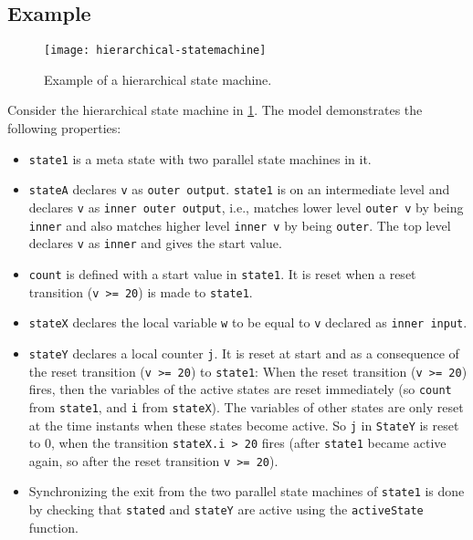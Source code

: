 \subsection{Example}\label{example}

\begin{figure}[H]
  \begin{center}
    \texttt{[image: hierarchical-statemachine]}
  \end{center}
  \caption{
    Example of a hierarchical state machine.
  }
  \label{fig:hierarchical-statemachine}
\end{figure}

\begin{example}
Consider the hierarchical state machine in \cref{fig:hierarchical-statemachine}.
The model demonstrates the following properties:
\begin{itemize}
\item
  \lstinline!state1! is a meta state with two parallel state machines in it.
\item
  \lstinline!stateA! declares \lstinline!v! as \lstinline!outer output!.
  \lstinline!state1! is on an intermediate level and declares \lstinline!v! as \lstinline!inner outer output!, i.e., matches lower level \lstinline!outer v! by being \lstinline!inner! and also matches higher level \lstinline!inner v! by being \lstinline!outer!.
  The top level declares \lstinline!v! as \lstinline!inner! and gives the start value.
\item
  \lstinline!count! is defined with a start value in \lstinline!state1!.
  It is reset when a reset transition (\lstinline!v >= 20!) is made to \lstinline!state1!.
\item
  \lstinline!stateX! declares the local variable \lstinline!w! to be equal to \lstinline!v! declared as \lstinline!inner input!.
\item
  \lstinline!stateY! declares a local counter \lstinline!j!.
  It is reset at start and as a consequence of the reset transition (\lstinline!v >= 20!) to \lstinline!state1!: When the reset transition (\lstinline!v >= 20!) fires, then the variables of the active states are reset immediately (so \lstinline!count! from \lstinline!state1!, and \lstinline!i! from \lstinline!stateX!).
  The variables of other states are only reset at the time instants when these states become active.
  So \lstinline!j! in \lstinline!StateY! is reset to 0, when the transition \lstinline!stateX.i > 20! fires (after \lstinline!state1! became active again, so after the reset transition \lstinline!v >= 20!).
\item
  Synchronizing the exit from the two parallel state machines of \lstinline!state1! is done by checking that \lstinline!stated! and \lstinline!stateY! are active using the \lstinline!activeState! function.
\end{itemize}


\end{example}
